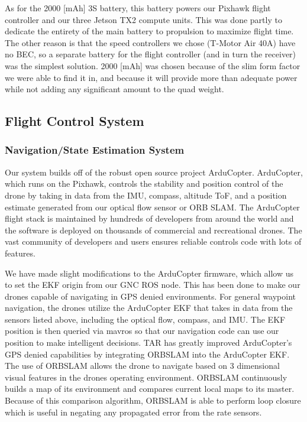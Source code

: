 \documentclass[12pt,letterpaper]{article}
\begin{document}
\pagebreak

As for the 2000 [mAh] 3S battery, this battery powers our Pixhawk flight controller and our three Jetson TX2 compute units. This was done partly to dedicate the entirety of the main battery to propulsion to maximize flight time. The other reason is that the speed controllers we chose (T-Motor Air 40A) have no BEC, so a separate battery for the flight controller (and in turn the receiver) was the simplest solution. 2000 [mAh] was chosen because of the slim form factor we were able to find it in, and because it will provide more than adequate power while not adding any significant amount to the quad weight.

	\subsection*{Flight Control System}
		\subsubsection*{Navigation/State Estimation System}

			Our system builds off of the robust open source project ArduCopter. ArduCopter, which runs on the Pixhawk, controls the stability and position control of the drone by taking in data from the IMU, compass, altitude ToF, and a position estimate generated from our optical flow sensor or ORB SLAM. The ArduCopter flight stack is maintained by hundreds of developers from around the world and the software is deployed on thousands of commercial and recreational drones. The vast community of developers and users ensures reliable controls code with lots of features.

			We have made slight modifications to the ArduCopter firmware, which allow us to set the EKF origin from our GNC ROS node. This has been done to make our drones capable of navigating in GPS denied environments. For general waypoint navigation, the drones utilize the ArduCopter EKF that takes in data from the sensors listed above, including the optical flow, compass, and IMU. The EKF position is then queried via mavros so that our navigation code can use our position to make intelligent decisions. TAR has greatly improved ArduCopter’s GPS denied capabilities by integrating ORBSLAM into the ArduCopter EKF. The use of ORBSLAM allows the drone to navigate based on 3 dimensional visual features in the drones operating environment. ORBSLAM continuously builds a map of its environment and compares current local maps to its master. Because of this comparison algorithm, ORBSLAM is able to perform loop closure which is useful in negating any propagated error from the rate sensors.
\end{document}
